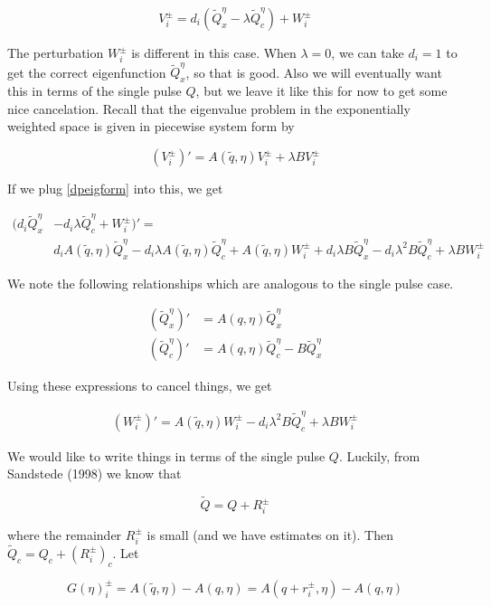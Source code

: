 \documentclass[12pt]{article}
\begin{document}
\begin{equation}\label{dpeigform}
V_i^\pm = d_i( \tilde{Q}^\eta_x - \lambda \tilde{Q}^\eta_c ) + W_i^\pm
\end{equation}

The perturbation $W_i^\pm$ is different in this case. When $\lambda = 0$, we can take $d_i = 1$ to get the correct eigenfunction $\tilde{Q}^\eta_x$, so that is good. Also we will eventually want this in terms of the single pulse $Q$, but we leave it like this for now to get some nice cancelation. Recall that the eigenvalue problem in the exponentially weighted space is given in piecewise system form by

\[
(V_i^\pm)' = A(\tilde{q}, \eta)V_i^\pm + \lambda B V_i^\pm
\]

If we plug \eqref{dpeigform} into this, we get 

\begin{align*}
(d_i \tilde{Q}^\eta_x &- d_i \lambda \tilde{Q}^\eta_c  + W_i^\pm)' = \\
& d_i A(\tilde{q}, \eta) \tilde{Q}^\eta_x - d_i \lambda A(\tilde{q}, \eta)\tilde{Q}^\eta_c
+ A(\tilde{q}, \eta) W_i^\pm + d_i \lambda B \tilde{Q}^\eta_x - d_i \lambda^2 B \tilde{Q}^\eta_c 
+ \lambda B W_i^\pm 
\end{align*}

We note the following relationships which are analogous to the single pulse case.

\begin{align*}
(\tilde{Q}^\eta_x)' &= A(q,\eta)\tilde{Q}^\eta_x \\
(\tilde{Q}^\eta_c)' &= A(q, \eta)\tilde{Q}^\eta_c - B \tilde{Q}^\eta_x  
\end{align*} 


Using these expressions to cancel things, we get

\begin{align*}
(W_i^\pm)' = A(\tilde{q}, \eta) W_i^\pm - d_i \lambda^2 B \tilde{Q}^\eta_c 
+ \lambda B W_i^\pm 
\end{align*}

We would like to write things in terms of the single pulse $Q$. Luckily, from Sandstede (1998) we know that

\[
\tilde{Q} = Q + R_i^\pm
\]

where the remainder $R_i^\pm$ is small (and we have estimates on it). Then $\tilde{Q}_c = Q_c + (R_i^\pm)_c$. Let

\[
G(\eta)_i^\pm = A(\tilde{q},\eta) - A(q,\eta) = A(q + r_i^\pm, \eta) - A(q, \eta)
\]
\end{document}
